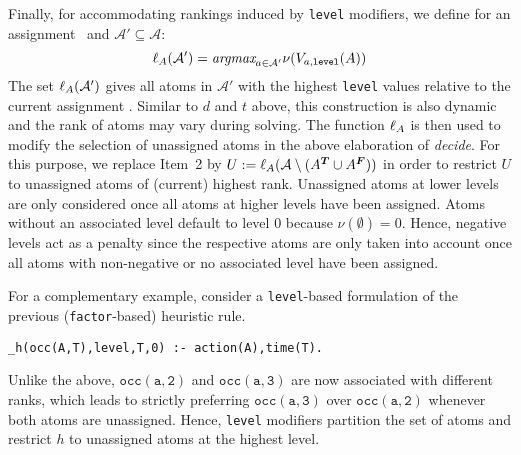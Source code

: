 Finally, for accommodating rankings induced by \texttt{level} modifiers,
we define for an assignment \ass\ and $\mathcal{A}'\subseteq\mathcal{A}$:
\[
\ell_{A}(\mathcal{A}')=\textit{argmax}_{a\in\mathcal{A}'}\nu(V_{a,\mathtt{level}}(A))
\]
The set $\ell_{A}(\mathcal{A}')$ gives all atoms in $\mathcal{A}'$ with the highest \texttt{level} values relative to
the current assignment \ass.
Similar to $d$ and $t$ above, this construction is also dynamic and the rank of atoms may vary during solving.
The function $\ell_{A}$ is then used to modify the selection of unassigned atoms in the above elaboration of \textit{decide}.
For this purpose, we replace Item~2 by
\(
U:=\ell_{A}(\mathcal{A}\setminus ({A}^{\boldsymbol{T}}\cup{\ensuremath{A}}^{\boldsymbol{F}}))
\)
in order to restrict $U$ to unassigned atoms of (current) highest rank.
Unassigned atoms at lower levels are only considered once all atoms at higher levels have been assigned.
Atoms without an associated level default to level 0 because $\nu(\emptyset)=0$.
Hence, negative levels act as a penalty since the respective atoms are only taken into account
once all atoms with non-negative or no associated level have been assigned.

For a complementary example, 
consider a \texttt{level}-based formulation of the previous (\texttt{factor}-based) heuristic rule.
\begin{lstlisting}
_h(occ(A,T),level,T,0) :- action(A),time(T).
\end{lstlisting}
Unlike the above, $\mathtt{occ(a,2)}$ and $\mathtt{occ(a,3)}$ are now associated with different ranks,
which leads to strictly preferring $\mathtt{occ(a,3)}$ over $\mathtt{occ(a,2)}$ 
whenever both atoms are unassigned.
Hence, \texttt{level} modifiers partition the set of atoms and restrict $h$ to unassigned atoms at the highest level.


